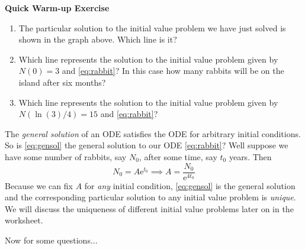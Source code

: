 {\bf Quick Warm-up Exercise}
\begin{enumerate}
 \item The particular solution to the initial value problem we have just solved is shown in the graph above. Which line is it?
 \item Which line represents the solution to the initial value problem given by $N(0)=3$ and \eqref{eq:rabbit}? In this case how many rabbits will be on the island after six months?
 \item Which line represents the solution to the initial value problem given by $N(\ln({3})/4)=15$ and \eqref{eq:rabbit}?
\end{enumerate}

The {\em general solution} of an ODE satisfies the ODE for arbitrary initial conditions. So is \eqref{eq:gensol} the general solution to our ODE \eqref{eq:rabbit}? Well suppose we have some number of rabbits, say $N_{0}$, after some time, say $t_{0}$ years. Then
\begin{equation*}
 N_{0}=A\text{e}^{t_{0}} \implies A = \frac{N_{0}}{\text{e}^{4t_{0}}}
\end{equation*}
Because we can fix $A$ for {\em any} initial condition, \eqref{eq:gensol} is the general solution and the corresponding particular solution to any initial value problem is {\em unique}. We will discuss the uniqueness of different initial value problems later on in the worksheet.

Now for some questions...